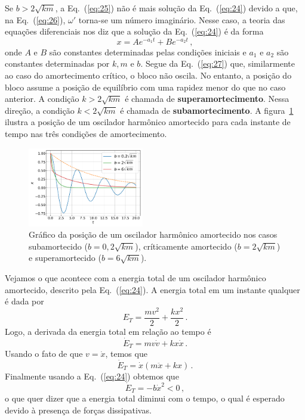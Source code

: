 \documentclass[twocolumn=on,fontsize=12pt,DIV=calc]{scrartcl}
\theoremstyle{definition}
\begin{document}
Se $b>2\sqrt{km}$, a Eq.~(\ref{eq:25}) não é mais solução da
Eq.~(\ref{eq:24}) devido a que, na Eq.~(\ref{eq:26}), $\omega'$
torna-se um número imaginário. Nesse caso, a teoria das equações
diferenciais nos diz que a solução da Eq.~(\ref{eq:24}) é da forma
\begin{equation}
  \label{eq:27}
  x=Ae^{-a_1t}+Be^{-a_2t}\,,
\end{equation}
onde $A$ e $B$ são constantes determinadas pelas condições iniciais e
$a_1$ e $a_2$ são constantes determinadas por $k,m$ e $b$. Segue da
Eq.~(\ref{eq:27}) que, similarmente ao caso do amortecimento crítico,
o bloco não oscila. No entanto, a posição do bloco assume a posição de
equilíbrio com uma rapidez menor do que no caso anterior. A condição
$k>2\sqrt{km}$ é chamada de \textbf{superamortecimento}. Nessa
direção, a condição $k<2\sqrt{km}$ é chamada de
\textbf{subamortecimento}. A figura~\ref{fig:osciladoramortecido}
ilustra a posição de um oscilador harmônico amortecido para cada
instante de tempo nas três condições de amortecimento.

\begin{figure}[ht]
  \centering
  \includegraphics[width=0.45\textwidth,keepaspectratio]{aux/osciladoramortecido.pdf}
  \caption{Gráfico da posição de um oscilador harmônico amortecido nos
    casos subamortecido ($b=0{,}2\sqrt{km}$), críticamente amortecido
    ($b=2\sqrt{km}$) e superamortecido ($b=6\sqrt{km}$).}
  \label{fig:osciladoramortecido}
\end{figure}

Vejamos o que acontece com a energia total de um oscilador harmônico
amortecido, descrito pela Eq.~(\ref{eq:24}). A energia total em um
instante qualquer é dada por
$$E_T=\frac{mv^2}{2}+\frac{kx^2}{2}\,.$$
Logo, a derivada da energia total em relação ao tempo é
$$\dot E_T=mv\dot v+kx\dot x\,.$$
Usando o fato de que $v=\dot x$, temos que
$$\dot E_T=\dot x(m\ddot x+kx)\,.$$
Finalmente usando a Eq.~(\ref{eq:24}) obtemos que
$$\dot E_T=-b\dot x^2<0\,,$$
o que quer dizer que a energia total diminui com o tempo, o qual é
esperado devido à presença de forças dissipativas.
\end{document}
